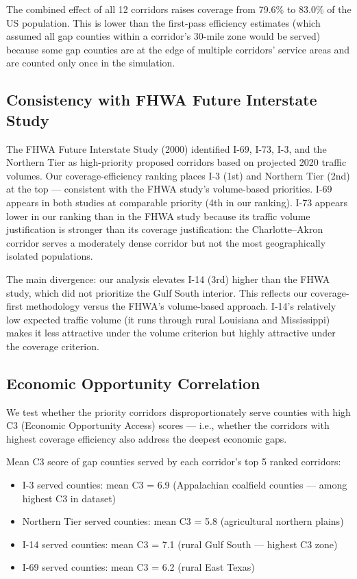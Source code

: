 The combined effect of all 12 corridors raises coverage from 79.6\% to 83.0\% of the US population. This is lower than the first-pass efficiency estimates (which assumed all gap counties within a corridor's 30-mile zone would be served) because some gap counties are at the edge of multiple corridors' service areas and are counted only once in the simulation.

\subsection{Consistency with FHWA Future Interstate Study}

The FHWA Future Interstate Study (2000) \citep{FHWA_FIS2000} identified I-69, I-73, I-3, and the Northern Tier as high-priority proposed corridors based on projected 2020 traffic volumes. Our coverage-efficiency ranking places I-3 (1st) and Northern Tier (2nd) at the top --- consistent with the FHWA study's volume-based priorities. I-69 appears in both studies at comparable priority (4th in our ranking). I-73 appears lower in our ranking than in the FHWA study because its traffic volume justification is stronger than its coverage justification: the Charlotte–Akron corridor serves a moderately dense corridor but not the most geographically isolated populations.

The main divergence: our analysis elevates I-14 (3rd) higher than the FHWA study, which did not prioritize the Gulf South interior. This reflects our coverage-first methodology versus the FHWA's volume-based approach. I-14's relatively low expected traffic volume (it runs through rural Louisiana and Mississippi) makes it less attractive under the volume criterion but highly attractive under the coverage criterion.

\subsection{Economic Opportunity Correlation}

We test whether the priority corridors disproportionately serve counties with high C3 (Economic Opportunity Access) scores --- i.e., whether the corridors with highest coverage efficiency also address the deepest economic gaps.

Mean C3 score of gap counties served by each corridor's top 5 ranked corridors:
\begin{itemize}
\item I-3 served counties: mean C3 = 6.9 (Appalachian coalfield counties --- among highest C3 in dataset)
\item Northern Tier served counties: mean C3 = 5.8 (agricultural northern plains)
\item I-14 served counties: mean C3 = 7.1 (rural Gulf South --- highest C3 zone)
\item I-69 served counties: mean C3 = 6.2 (rural East Texas)
\end{itemize}

